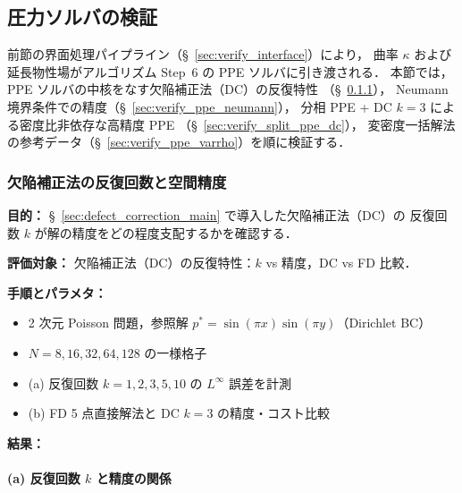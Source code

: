 %

\subsection{圧力ソルバの検証}
\label{sec:verify_solver}

前節の界面処理パイプライン（§~\ref{sec:verify_interface}）により，
曲率 $\kappa$ および延長物性場がアルゴリズム Step~6 の PPE ソルバに引き渡される．
本節では，PPE ソルバの中核をなす欠陥補正法（DC）の反復特性
（§~\ref{sec:verify_ppe}），
Neumann 境界条件での精度（§~\ref{sec:verify_ppe_neumann}），
分相 PPE + DC $k{=}3$ による密度比非依存な高精度 PPE
（§~\ref{sec:verify_split_ppe_dc}），
変密度一括解法の参考データ（§~\ref{sec:verify_ppe_varrho}）を順に検証する．


\subsubsection{欠陥補正法の反復回数と空間精度}
\label{sec:verify_ppe}
\label{sec:dc_iteration_accuracy}

\noindent\textbf{目的：}
§~\ref{sec:defect_correction_main} で導入した欠陥補正法（DC）の
反復回数 $k$ が解の精度をどの程度支配するかを確認する．

\noindent\textbf{評価対象：}
欠陥補正法（DC）の反復特性：$k$ vs 精度，DC vs FD 比較．

\noindent\textbf{手順とパラメタ：}
\begin{itemize}[noitemsep]
  \item 2 次元 Poisson 問題，参照解 $p^* = \sin(\pi x)\sin(\pi y)$（Dirichlet BC）
  \item $N = 8, 16, 32, 64, 128$ の一様格子
  \item (a) 反復回数 $k = 1, 2, 3, 5, 10$ の $L^\infty$ 誤差を計測
  \item (b) FD 5 点直接解法と DC $k{=}3$ の精度・コスト比較
\end{itemize}

\noindent\textbf{結果：}

\paragraph{(a) 反復回数 $k$ と精度の関係}

